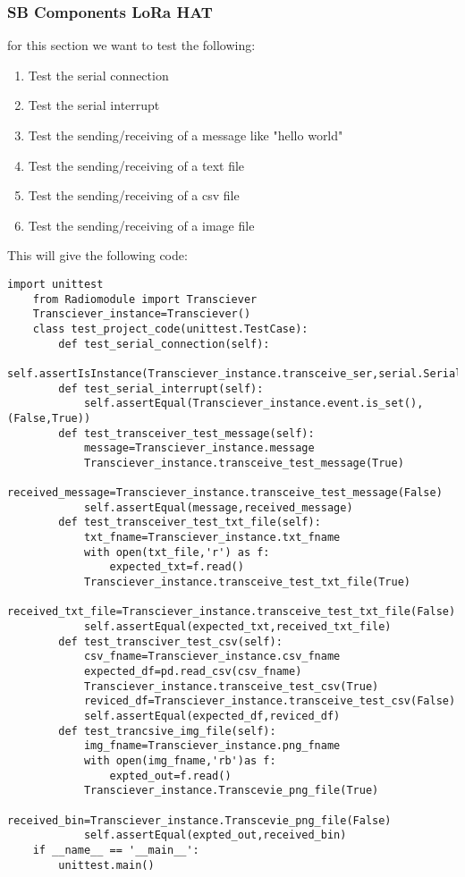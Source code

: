 \subsubsection{SB Components LoRa HAT}
for this section we want to test the following:
\begin{enumerate}
    \item Test the serial connection
    \item Test the serial interrupt
    \item Test the sending/receiving of a message like "hello world"
    \item Test the sending/receiving of a text file 
    \item Test the sending/receiving of a csv file
    \item Test the sending/receiving of a image file
\end{enumerate}
This will give  the following code:
\begin{lstlisting}[style=mystyle]
    import unittest
    from Radiomodule import Transciever
    Transciever_instance=Transciever()
    class test_project_code(unittest.TestCase):
        def test_serial_connection(self):
            self.assertIsInstance(Transciever_instance.transceive_ser,serial.Serial)
        def test_serial_interrupt(self):
            self.assertEqual(Transciever_instance.event.is_set(),(False,True))
        def test_transceiver_test_message(self):
            message=Transciever_instance.message
            Transciever_instance.transceive_test_message(True)
            received_message=Transciever_instance.transceive_test_message(False)
            self.assertEqual(message,received_message)
        def test_transceiver_test_txt_file(self):
            txt_fname=Transciever_instance.txt_fname
            with open(txt_file,'r') as f:
                expected_txt=f.read()
            Transciever_instance.transceive_test_txt_file(True)
            received_txt_file=Transciever_instance.transceive_test_txt_file(False)
            self.assertEqual(expected_txt,received_txt_file)
        def test_transciver_test_csv(self):
            csv_fname=Transciever_instance.csv_fname
            expected_df=pd.read_csv(csv_fname)
            Transciever_instance.transceive_test_csv(True)
            reviced_df=Transciever_instance.transceive_test_csv(False)
            self.assertEqual(expected_df,reviced_df)
        def test_trancsive_img_file(self):
            img_fname=Transciever_instance.png_fname
            with open(img_fname,'rb')as f:
                expted_out=f.read()
            Transciever_instance.Transcevie_png_file(True)
            received_bin=Transciever_instance.Transcevie_png_file(False)
            self.assertEqual(expted_out,received_bin)
    if __name__ == '__main__':
        unittest.main()
\end{lstlisting}
